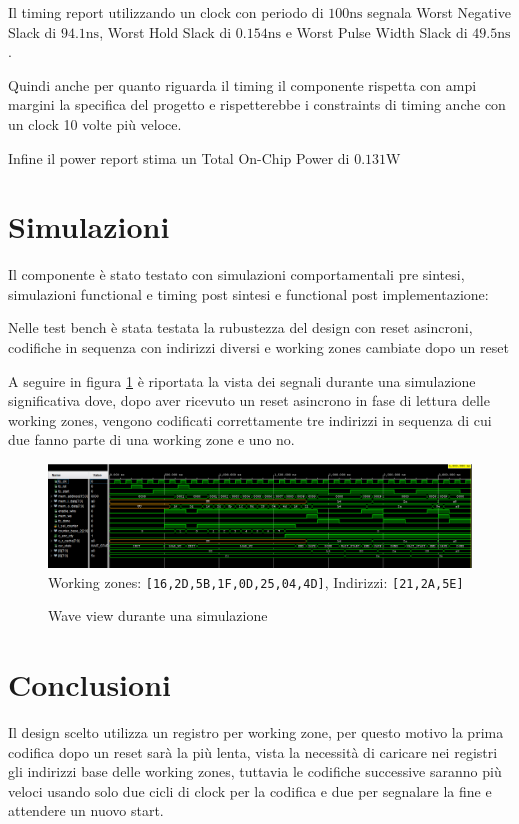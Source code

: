 \documentclass[a4paper]{article}
\begin{document}
Il timing report utilizzando un clock con periodo di $100\mathrm{ns}$ segnala Worst Negative Slack di $94.1\mathrm{ns}$, Worst Hold Slack di $0.154\mathrm{ns}$ e Worst Pulse Width Slack di $49.5\mathrm{ns}$.

Quindi anche per quanto riguarda il timing il componente rispetta con ampi margini la specifica del progetto e rispetterebbe i constraints di timing anche con un clock 10 volte più veloce.

Infine il power report stima un Total On-Chip Power di $0.131\mathrm{W}$

\section{Simulazioni}

Il componente è stato testato con simulazioni comportamentali pre sintesi, simulazioni functional e timing post sintesi e functional post implementazione:

Nelle test bench è stata testata la rubustezza del design con reset asincroni, codifiche in sequenza con indirizzi diversi e working zones cambiate dopo un reset

A seguire in figura \ref{fig:wave} è riportata la vista dei segnali durante una simulazione significativa dove, dopo aver ricevuto un reset asincrono in fase di lettura delle working zones, vengono codificati correttamente tre indirizzi in sequenza di cui due fanno parte di una working zone e uno no.

\begin{figure}[H]
  \centering
  \includegraphics[width=\linewidth]{waveview.png}
  {
    \small
    Working zones: \texttt{[16,2D,5B,1F,0D,25,04,4D]}, Indirizzi: \texttt{[21,2A,5E]}
  }
  \caption{Wave view durante una simulazione}
  \label{fig:wave}
\end{figure}

\section{Conclusioni}

Il design scelto utilizza un registro per working zone, per questo motivo la prima codifica dopo un reset sarà la più lenta, vista la necessità di caricare nei registri gli indirizzi base delle working zones, tuttavia le codifiche successive saranno più veloci usando solo due cicli di clock per la codifica e due per segnalare la fine e attendere un nuovo start.
\end{document}
